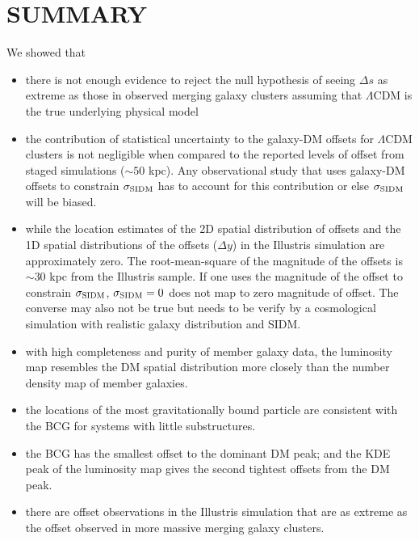 \section{SUMMARY}
We showed that 
\begin{itemize}
		\item there is not enough evidence 
			 to reject the null hypothesis of
			seeing $\Delta s$ as extreme as those in observed merging galaxy clusters assuming that
			$\Lambda$CDM is the true underlying physical model  \\

		\item the contribution of statistical uncertainty to the galaxy-DM offsets 
			for $\Lambda$CDM clusters is not negligible when compared to the reported
			levels of offset from staged simulations ($\sim 50$ kpc). Any
			observational study that uses 
			galaxy-DM offsets to
			constrain $\sigma_{\rm SIDM}$ has to account for this contribution
			or else $\sigma_{\rm SIDM}$ will be biased. \\

		\item while the location estimates of the 2D spatial distribution of offsets and the
			1D spatial distributions of the offsets ($\Delta y$) in the Illustris
			simulation are approximately zero.
			The root-mean-square of the magnitude of the
			offsets is $\sim 30$ kpc from the Illustris sample. 
			If one uses the magnitude of the offset to constrain
			$\sigma_{\rm SIDM}$, $\sigma_{\rm SIDM} = 0$ 
			does not map to zero magnitude of offset.  
			The converse may also not be true but needs to be verify by a
			cosmological simulation with realistic galaxy distribution and SIDM. 
			\\

		\item with high completeness and purity of member galaxy data, the
			luminosity map resembles the DM spatial distribution more closely than 
			the number density map of member galaxies. \\ 

		\item the locations of the most gravitationally bound particle are consistent 
			with the BCG for systems with little substructures.  \\

		\item the BCG has the smallest offset to the dominant DM peak; and  
			the KDE peak of the luminosity map gives the second tightest 
			offsets from the DM peak. \\

		\item there are offset observations in the Illustris simulation that are as
			extreme as the offset observed in more massive merging galaxy clusters. 
			


\end{itemize}

